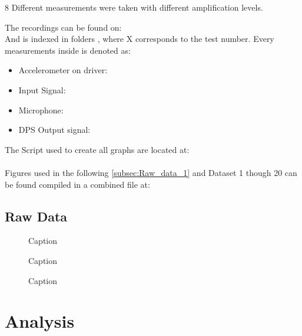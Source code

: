 8 Different measurements were taken with different amplification levels.

The recordings can be found on:\\
And is indexed in folders , where X corresponds to the test number. Every measurements inside is denoted as:
\begin{itemize}
\item Accelerometer on driver: 
\item Input Signal: 
\item Microphone: 
\item DPS Output signal: 
\end{itemize}
\vspace*{-5mm}
The Script used to create all graphs are located at:\\
\\
Figures used in the following \ref{subsec:Raw_data_1} and Dataset 1 though 20 can be found compiled in a combined file at:


\subsection{Raw Data}

\begin{figure}[H]
	\centering
	
	\caption{Caption }
	\label{fig:Driver2Test}
\end{figure}

\begin{figure}[H]
	\centering
	
	\caption{Caption }
	\label{fig:Driver5Test}
\end{figure}


\begin{figure}[H]
	\centering
	
	\caption{Caption }
	\label{fig:Driver10Test}
\end{figure}



\section{Analysis}

